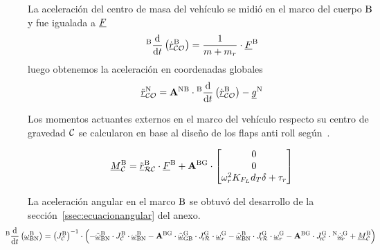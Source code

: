 La aceleración del centro de masa del vehículo se midió en el marco del cuerpo $\mathrm{B}$ y fue igualada a  ${ \underline{F} }$
\begin{equation}
	{}^{\mathrm{B}}\frac{\textrm{d} }{\textrm{d} t}\left( \dot{{ \underline{r} }}_{\mathcal{CO}}^{\mathrm{B}} \right) = \frac{1}{m+m_r} \cdot { \underline{F} }^{\mathrm{B}}
\end{equation}
luego obtenemos la aceleración en coordenadas globales
\begin{equation}
	\ddot{{ \underline{r} }}_{\mathcal{CO}}^{\mathrm{N}} =
	\mathbf{A}^{\mathrm{NB}}\cdot {}^{\mathrm{B}}\frac{\textrm{d} }{\textrm{d} t}\left( \dot{{ \underline{r} }}_{\mathcal{CO}}^{\mathrm{B}} \right)- { \underline{g} }^{\mathrm{N}}
\end{equation}

Los momentos actuantes externos en el marco del vehículo respecto su centro de gravedad $\mathcal{C}$ se calcularon en base al diseño de los flaps anti roll según~\cite{isaac2022mathematical}.

\begin{equation}
	{ \underline{M} }^{\mathrm{B}}_{\mathcal{C}} = \tilde{{ \underline{r} }}_{\mathcal{RC}}^{\mathrm{B}}\cdot { \underline{F} }^{\mathrm{B}} + \mathbf{A}^{\mathrm{BG}} \cdot 
	\begin{bmatrix}
		0 \\
		0 \\
		\omega_r^2 K_{F_L}d_T\delta+\tau_r
	\end{bmatrix}  
\end{equation}

La aceleración angular en el marco $\mathrm{B}$ se obtuvó del desarrollo de la sección~\ref{ssec:ecuacionangular} del anexo.
\begin{equation}
	\hspace{-1cm}
{}^\frm{B}\frac{\di }{\di t} \left(\avec{\omega}_\frm{BN}^\frm{B} \right) =  \left(\inertia{C}{B}\right)^{-1} \cdot \left( - \skw{\avec{\omega}}_\frm{BN}^\frm{B} \cdot \inertia{C}{B}\cdot \avec{\omega}_{\frm{BN}}^{\frm{B}} - 
\transform{{BG}} \cdot\skw{\avec{\omega}}_\frm{GB}^\frm{G} \cdot \inertiarotor{R}{G}  \cdot \avec{\omega}_r^\frm{G} -
\skw{\avec{\omega}}_\frm{BN}^\frm{B} \cdot \inertiarotor{R}{G}  \cdot \avec{\omega}_r^\frm{G} -
\transform{{BG}}\cdot  \inertiarotor{C}{G} \cdot  {}^\frm{N} \dot{\avec{\omega}}_{\!r}^{\frm{G}} + \avec{M}_\ogn{C}^\frm{B} \right)
\end{equation}

